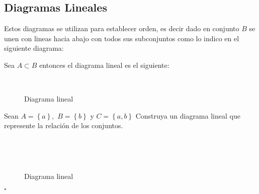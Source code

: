 \subsection{Diagramas Lineales}

Estos diagramas se utilizan para establecer orden, es decir dado en
conjunto $B$ se unen con lineas hacia abajo con todos sus subconjuntos
como lo indico en el siguiente diagrama:

\begin{ejemplo}

Sea $A\subset B$ entonces el diagrama lineal es el siguiente:

\end{ejemplo}

\begin{figure}[H]
\centering 
{}\\[-5pt]
\caption{Diagrama lineal}
\label{diagl}
\end{figure}

\begin{ejemplo}

Sean $A=\left\{ a\right\} ,$ $B=\left\{ b\right\} $ y $C=\left\{ a,b\right\} $
Construya un diagrama lineal que represente la relación de los conjuntos.

\end{ejemplo}

\solu \\
\begin{figure}[H]
\centering 
{}\\[-5pt]
\caption{Diagrama lineal}
\label{diagl2}
\end{figure}
\hfill $\square$

